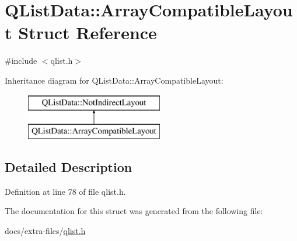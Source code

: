 \hypertarget{struct_q_list_data_1_1_array_compatible_layout}{}\section{Q\+List\+Data\+:\+:Array\+Compatible\+Layout Struct Reference}
\label{struct_q_list_data_1_1_array_compatible_layout}


{\ttfamily \#include $<$qlist.\+h$>$}

Inheritance diagram for Q\+List\+Data\+:\+:Array\+Compatible\+Layout\+:\begin{figure}[H]
\begin{center}
\leavevmode
\includegraphics[height=2.000000cm]{struct_q_list_data_1_1_array_compatible_layout}
\end{center}
\end{figure}


\subsection{Detailed Description}


Definition at line 78 of file qlist.\+h.



The documentation for this struct was generated from the following file\+:\begin{DoxyCompactItemize}
\item 
docs/extra-\/files/\hyperlink{qlist_8h}{qlist.\+h}\end{DoxyCompactItemize}
